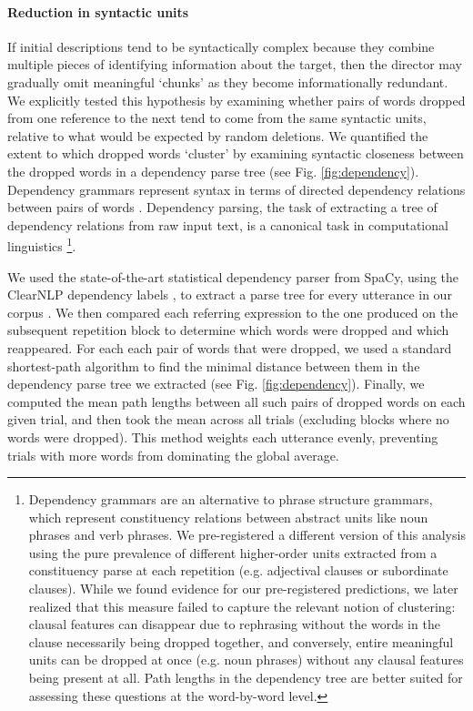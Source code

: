 \documentclass[alpha-refs]{wiley-article}
\begin{document}
\paragraph{Reduction in syntactic units}
If initial descriptions tend to be syntactically complex because they combine multiple pieces of identifying information about the target, then the director may gradually omit meaningful `chunks' as they become informationally redundant.
We explicitly tested this hypothesis by examining whether pairs of words dropped from one reference to the next tend to come from the same syntactic units, relative to what would be expected by random deletions.
We quantified the extent to which dropped words `cluster' by examining syntactic closeness between the dropped words in a dependency parse tree (see Fig. \ref{fig:dependency}).
Dependency grammars represent syntax in terms of directed dependency relations between pairs of words \citep{hudson1984word,corbett1993heads}. 
Dependency parsing, the task of extracting a tree of dependency relations from raw input text, is a canonical task in computational linguistics \citep{jurafsky2014speech,kubler2009dependency}\footnote{Dependency grammars are an alternative to phrase structure grammars, which represent constituency relations between abstract units like noun phrases and verb phrases. We pre-registered a different version of this analysis using the pure prevalence of different higher-order units extracted from a constituency parse at each repetition (e.g. adjectival clauses or subordinate clauses). While we found evidence for our pre-registered predictions, we later realized that this measure failed to capture the relevant notion of clustering: clausal features can disappear due to rephrasing without the words in the clause necessarily being dropped together, and conversely, entire meaningful units can be dropped at once (e.g. noun phrases) without any clausal features being present at all. Path lengths in the dependency tree are better suited for assessing these questions at the word-by-word level.}. 

We used the state-of-the-art statistical dependency parser from SpaCy, using the ClearNLP dependency labels \citep{choi_palmer2012}, to extract a parse tree for every utterance in our corpus \citep[see][for details on neural network architectures for parsing]{honnibal2015improved, kiperwasser2016simple}.
We then compared each referring expression to the one produced on the subsequent repetition block to determine which words were dropped and which reappeared.
For each each pair of words that were dropped, we used a standard shortest-path algorithm to find the minimal distance between them in the dependency parse tree we extracted (see Fig. \ref{fig:dependency}).
Finally, we computed the mean path lengths between all such pairs of dropped words on each given trial, and then took the mean across all trials (excluding blocks where no words were dropped).
This method weights each utterance evenly, preventing trials with more words from dominating the global average.
\end{document}
